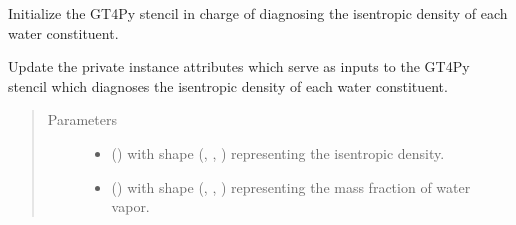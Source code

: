 \documentclass[letterpaper,10pt,english]{sphinxmanual}
\begin{document}
\begin{fulllineitems}
\begin{fulllineitems}
\begin{quote}
\begin{description}
\begin{itemize}
\end{itemize}


\end{description}\end{quote}

\end{fulllineitems}


\begin{fulllineitems}
\label{\detokenize{api:tasmania.dycore.diagnostic_isentropic.DiagnosticIsentropic._stencil_diagnosing_water_constituents_isentropic_density_initialize}}
Initialize the GT4Py stencil in charge of diagnosing the isentropic density of each water constituent.

\end{fulllineitems}


\begin{fulllineitems}
\label{\detokenize{api:tasmania.dycore.diagnostic_isentropic.DiagnosticIsentropic._stencil_diagnosing_water_constituents_isentropic_density_set_inputs}}
Update the private instance attributes which serve as inputs to the GT4Py stencil which diagnoses
the isentropic density of each water constituent.
\begin{quote}\begin{description}
\item[{Parameters}] \leavevmode\begin{itemize}
\item {} 
 () \textendash{}  with shape (, , ) representing the isentropic density.

\item {} 
 () \textendash{}  with shape (, , ) representing the mass fraction of
water vapor.


\end{itemize}
\end{description}
\end{quote}
\end{fulllineitems}
\end{fulllineitems}
\end{document}
